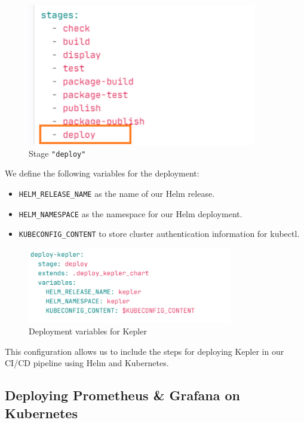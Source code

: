 \begin{figure}[H]
  \centering
  \includegraphics[width=10cm]{Figures/deploy-kepler-stage.png}
  \caption{Stage \texttt{"deploy"}}
\end{figure}

We define the following variables for the deployment:

\begin{itemize}
    \item \texttt{HELM\_RELEASE\_NAME} as the name of our Helm release.
    \item \texttt{HELM\_NAMESPACE} as the namespace for our Helm deployment.
    \item \texttt{KUBECONFIG\_CONTENT} to store cluster authentication information for kubectl.
\end{itemize}

\begin{figure}[H]
  \centering
  \includegraphics[width=0.8\textwidth]{Figures/deployment-variable.png}
  \caption{Deployment variables for Kepler}
\end{figure}

This configuration allows us to include the steps for deploying Kepler in our CI/CD pipeline using Helm and Kubernetes.


\subsection{Deploying Prometheus \& Grafana on Kubernetes}

